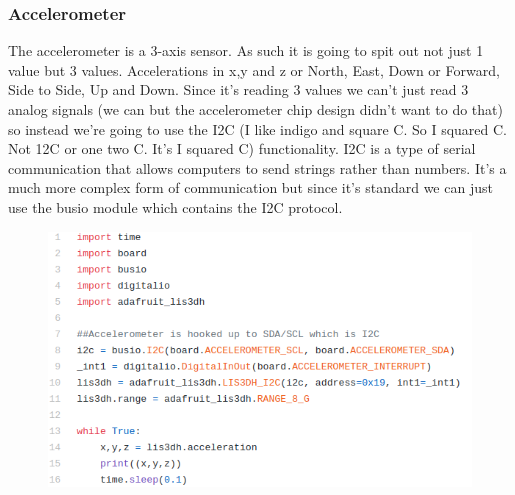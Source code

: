 {\subsubsection{Accelerometer}
The accelerometer is a 3-axis sensor. As such it is going to spit out not just 1 value but 3 values. Accelerations in x,y and z or North, East, Down or Forward, Side to Side, Up and Down. Since it’s reading 3 values we can’t just read 3 analog signals (we can but the accelerometer chip design didn’t want to do that) so instead we’re going to use the I2C (I like indigo and square C. So I squared C. Not 12C or one two C. It’s I squared C) functionality. I2C is a type of serial communication that allows computers to send strings rather than numbers. It’s a much more complex form of communication but since it’s standard we can just use the busio module which contains the I2C protocol.
\begin{figure}[H]
  \begin{center}
    \includegraphics[width=\textwidth]{Figures/accelerometer_code.png}
  \end{center}
\end{figure}
}
